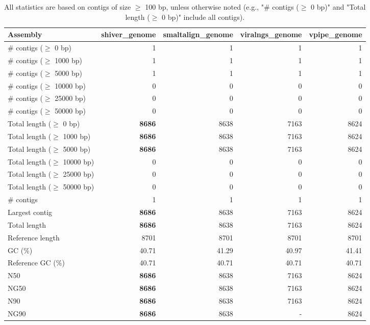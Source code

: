 \documentclass[12pt,a4paper]{article}
\begin{document}
\begin{table}[ht]
\begin{center}
\caption{All statistics are based on contigs of size $\geq$ 100 bp, unless otherwise noted (e.g., "\# contigs ($\geq$ 0 bp)" and "Total length ($\geq$ 0 bp)" include all contigs).}
\begin{tabular}{|l*{4}{|r}|}
\hline
Assembly & shiver\_genome & smaltalign\_genome & viralngs\_genome & vpipe\_genome \\ \hline
\# contigs ($\geq$ 0 bp) & 1 & 1 & 1 & 1 \\ \hline
\# contigs ($\geq$ 1000 bp) & 1 & 1 & 1 & 1 \\ \hline
\# contigs ($\geq$ 5000 bp) & 1 & 1 & 1 & 1 \\ \hline
\# contigs ($\geq$ 10000 bp) & 0 & 0 & 0 & 0 \\ \hline
\# contigs ($\geq$ 25000 bp) & 0 & 0 & 0 & 0 \\ \hline
\# contigs ($\geq$ 50000 bp) & 0 & 0 & 0 & 0 \\ \hline
Total length ($\geq$ 0 bp) & {\bf 8686} & 8638 & 7163 & 8624 \\ \hline
Total length ($\geq$ 1000 bp) & {\bf 8686} & 8638 & 7163 & 8624 \\ \hline
Total length ($\geq$ 5000 bp) & {\bf 8686} & 8638 & 7163 & 8624 \\ \hline
Total length ($\geq$ 10000 bp) & 0 & 0 & 0 & 0 \\ \hline
Total length ($\geq$ 25000 bp) & 0 & 0 & 0 & 0 \\ \hline
Total length ($\geq$ 50000 bp) & 0 & 0 & 0 & 0 \\ \hline
\# contigs & 1 & 1 & 1 & 1 \\ \hline
Largest contig & {\bf 8686} & 8638 & 7163 & 8624 \\ \hline
Total length & {\bf 8686} & 8638 & 7163 & 8624 \\ \hline
Reference length & 8701 & 8701 & 8701 & 8701 \\ \hline
GC (\%) & 40.71 & 41.29 & 40.97 & 41.41 \\ \hline
Reference GC (\%) & 40.71 & 40.71 & 40.71 & 40.71 \\ \hline
N50 & {\bf 8686} & 8638 & 7163 & 8624 \\ \hline
NG50 & {\bf 8686} & 8638 & 7163 & 8624 \\ \hline
N90 & {\bf 8686} & 8638 & 7163 & 8624 \\ \hline
NG90 & {\bf 8686} & 8638 & - & 8624 \\ \hline

\end{tabular}
\end{center}
\end{table}
\end{document}
